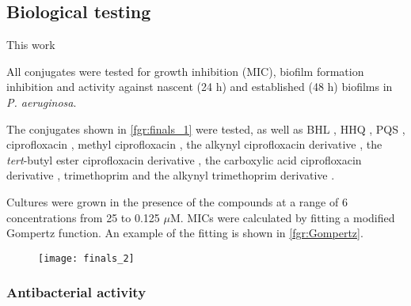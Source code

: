 \subsection{Biological testing\label{sec:bio2}}




This work 

All conjugates were tested for growth inhibition (MIC), biofilm formation inhibition and activity against nascent (24 h) and established (48 h) biofilms in \textit{P. aeruginosa}.

The conjugates shown in \ref{fgr:finals_1} were tested, as well as BHL , HHQ , PQS , ciprofloxacin , methyl ciprofloxacin , the alkynyl ciprofloxacin derivative , the \textit{tert}-butyl ester ciprofloxacin derivative , the carboxylic acid ciprofloxacin derivative , trimethoprim  and the alkynyl trimethoprim derivative .

Cultures were grown in the presence of the compounds at a range of 6 concentrations from 25 to 0.125 $\mu$M. MICs were calculated by fitting a modified Gompertz function\cite{Lambert2016}. An example of the fitting is shown in \ref{fgr:Gompertz}. 

\begin{figure}[H]
	\begin{center}
		\texttt{[image: finals\_2]}
		\caption{
 		\label{fgr:finals_2}}
	\end{center}
\end{figure}

\subsubsection{Antibacterial activity}

